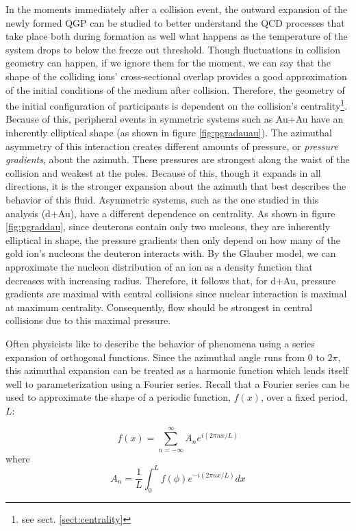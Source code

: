 \begin{figure}[p]
  \label{fig:pressuregradients}
\end{figure}


In the moments immediately after a collision event, the outward expansion of the newly formed QGP can be studied to better understand the QCD processes that take place both during formation as well what happens as the temperature of the system drops to below the freeze out threshold. Though fluctuations in collision geometry can happen, if we ignore them for the moment, we can say that the shape of the colliding ions' cross-sectional overlap provides a good approximation of the initial conditions of the medium after collision. Therefore, the geometry of the initial configuration of participants is dependent on the collision's centrality\footnote{see sect. \ref{sect:centrality}}. Because of this, peripheral events in symmetric systems such as Au+Au have an inherently elliptical shape (as shown in figure \ref{fig:pgradauau}). The azimuthal asymmetry of this interaction creates different amounts of pressure, or \textit{pressure gradients}, about the azimuth. These pressures are strongest along the waist of the collision and weakest at the poles. Because of this, though it expands in all directions, it is the stronger expansion about the azimuth that best describes the behavior of this fluid. Asymmetric systems, such as the one studied in this analysis (d+Au), have a different dependence on centrality. As shown in figure \ref{fig:pgraddau}, since deuterons contain only two nucleons, they are inherently elliptical in shape, the pressure gradients then only depend on how many of the gold ion's nucleons the deuteron interacts with. By the Glauber model, we can approximate the nucleon distribution of an ion as a density function that decreases with increasing radius. Therefore, it follows that, for d+Au, pressure gradients are maximal with central collisions since nuclear interaction is maximal at maximum centrality. Consequently, flow should be strongest in central collisions due to this maximal pressure.  

Often physicists like to describe the behavior of phenomena using a series expansion of orthogonal functions. Since the azimuthal angle runs from $0$ to $2 \pi$, this azimuthal expansion can be treated as a harmonic function which lends itself well to parameterization using a Fourier series. Recall that a Fourier series can be used to approximate the shape of a periodic function, $f(x)$, over a fixed period, $L$:

\begin{equation}
f(x) = \sum^{\infty}_{n=-\infty} A_{n} e^{i(2 \pi n x / L)}
\end{equation}
where
\begin{equation}
A_{n} = \frac{1}{L} \int^{L}_{0} f(\phi) e^{-i(2 \pi n x / L)} dx
\end{equation}

